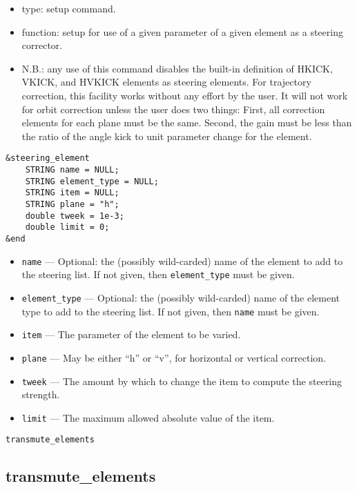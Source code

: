 \documentclass[11pt]{article}
\begin{document}
\begin{itemize}
\item type: setup command.
\item function: setup for use of a given parameter of a given element as a steering corrector.
\item N.B.: any use of this command disables the built-in definition of HKICK, VKICK, and HVKICK elements
as steering elements.  For trajectory correction, this facility works without any effort by the user.
It will not work for orbit correction unless the user does two things: First, all correction elements
for each plane must be the same.  Second, the gain must be less than the ratio of the angle kick to
unit parameter change for the element.
\end{itemize}

\begin{verbatim}
&steering_element
    STRING name = NULL;
    STRING element_type = NULL;
    STRING item = NULL;
    STRING plane = "h";
    double tweek = 1e-3;
    double limit = 0;
&end
\end{verbatim}

\begin{itemize}
\item \verb|name| --- Optional: the (possibly wild-carded) name of the element to add to the steering list.
        If not given, then \verb|element_type| must be given.
\item \verb|element_type| --- Optional: the (possibly wild-carded) name of the element type to add to the
        steering list.  If not given, then \verb|name| must be given.
\item \verb|item| --- The parameter of the element to be varied.
\item \verb|plane| --- May be either ``h'' or ``v'', for horizontal or vertical correction.
\item \verb|tweek| --- The amount by which to change the item to compute the steering strength.
\item \verb|limit| --- The maximum allowed absolute value of the item.
\end{itemize}

\begin{latexonly}
\newpage
\begin{center}{\Large\verb|transmute_elements|}\end{center}
\end{latexonly}
\subsection{transmute\_elements \label{subsec:transmuteelements}}
\end{document}
